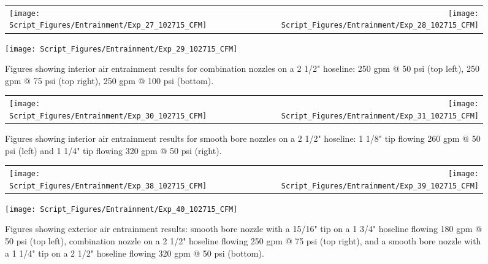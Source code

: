 \documentclass[12pt,oneside]{book}
\begin{document}
\clearpage

\begin{figure}[!ht]
\begin{tabular*}{\textwidth}{lr}
\texttt{[image: Script\_Figures/Entrainment/Exp\_27\_102715\_CFM]} &
\texttt{[image: Script\_Figures/Entrainment/Exp\_28\_102715\_CFM]} \\
\end{tabular*}
\centering
\texttt{[image: Script\_Figures/Entrainment/Exp\_29\_102715\_CFM]} 
\caption{Figures showing interior air entrainment results for combination nozzles on a 2 1/2" hoseline: 250 gpm @ 50 psi (top left), 250 gpm @ 75 psi (top right), 250 gpm @ 100 psi (bottom).}
\label{fig:2_5_Interior_Combination}
\end{figure}

\clearpage

\begin{figure}[!ht]
\begin{tabular*}{\textwidth}{lr}
\texttt{[image: Script\_Figures/Entrainment/Exp\_30\_102715\_CFM]} &
\texttt{[image: Script\_Figures/Entrainment/Exp\_31\_102715\_CFM]} \\
\end{tabular*}
\caption{Figures showing interior air entrainment results for smooth bore nozzles on a 2 1/2" hoseline: 1 1/8" tip flowing 260 gpm @ 50 psi (left) and 1 1/4" tip flowing 320 gpm @ 50 psi (right).}
\label{fig:2_5_Interior_Smooth_Bore}
\end{figure}

\clearpage

\begin{figure}[!ht]
\begin{tabular*}{\textwidth}{lr}
\texttt{[image: Script\_Figures/Entrainment/Exp\_38\_102715\_CFM]} &
\texttt{[image: Script\_Figures/Entrainment/Exp\_39\_102715\_CFM]} \\
\end{tabular*}
\centering
\texttt{[image: Script\_Figures/Entrainment/Exp\_40\_102715\_CFM]} 
\caption{Figures showing exterior air entrainment results: smooth bore nozzle with a 15/16" tip on a 1 3/4" hoseline flowing 180 gpm @ 50 psi (top left), combination nozzle on a 2 1/2" hoseline flowing 250 gpm @ 75 psi (top right), and a smooth bore nozzle with a 1 1/4" tip on a 2 1/2" hoseline flowing 320 gpm @ 50 psi (bottom).}
\label{fig:Exterior_Tests}
\end{figure}

\clearpage
\end{document}
